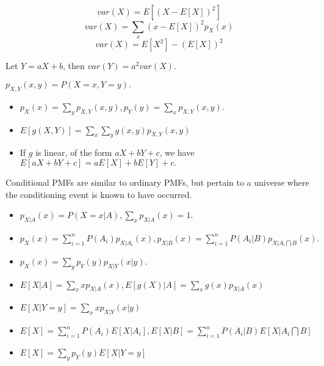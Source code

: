 \documentclass{article}
\begin{document}

\[var(X) = E[(X - E[X])^2]\]
\[var(X) = \sum\limits_{x}(x - E[X])^2p_{X}(x)\]
\[var(X) = E[X^2] - (E[X])^2\]
\begin{center}
Let $Y = aX +b$, then $var(Y) = a^2var(X)$.
\end{center}


\begin{center}
$p_{X,Y}(x,y) = P(X = x,Y = y).$
\end{center}
\begin{itemize}
\item

$p_{X}(x) = \sum\limits_yp_{X,Y}(x,y), p_{Y}(y) = \sum\limits_xp_{X,Y}(x,y).$
\item

$E[g(X,Y)] = \sum\limits_x\sum\limits_y g(x,y)p_{X,Y}(x,y)$ 
\item

If $g$ is linear, of the form $aX + bY +c$, we have $E[aX + bY + c] = aE[X] + bE[Y] + c.$
\end{itemize}


Conditional PMFs are similar to ordinary PMFs, but pertain to a universe where the conditioning event is known to have occurred.
\begin{itemize}
\item

$p_{X|A}(x) = P(X = x|A), \sum\limits_xp_{X|A}(x) = 1.$
\item

$p_X(x) = \sum\limits_{i=1}^nP(A_i)p_{X|A_i}(x), p_{X|B}(x) = \sum\limits_{i=1}^nP(A_i|B)p_{X|A_i\bigcap B}(x).$
\item

$p_X(x) = \sum\limits_yp_Y(y)p_{X|Y}(x|y).$
\end{itemize}

\begin{itemize}
\item

$E[X|A] = \sum\limits_xxp_{X|A}(x), E[g(X)|A] = \sum\limits_xg(x)p_{X|A}(x)$
\item

$E[X|Y = y] = \sum\limits_xxp_{X|Y}(x|y)$
\item

$E[X] = \sum\limits_{i=1}^nP(A_i)E[X|A_i], E[X|B] = \sum\limits_{i=1}^nP(A_i|B)E[X|A_i\bigcap B]$
\item

$E[X] = \sum\limits_yp_Y(y)E[X|Y = y]$
\end{itemize}
\end{document}
